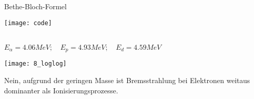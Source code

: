 \documentclass{alex_hü}
\begin{document}
\begin{mybox}{Bethe-Bloch-Formel}
	\centering \(  \)
	\tcblower
		\begin{minipage}{\textwidth}
			\texttt{[image: code]}
		\end{minipage}
		\vspace{0.5cm} \\
		\( E_{\alpha} = 4.06 \unit{MeV};\quad E_p = 4.93 \unit{MeV};\quad E_d = 4.59 \unit{MeV} \)
	\tcbline
		\begin{minipage}{\textwidth}
			\texttt{[image: 8\_loglog]}
		\end{minipage}
	\tcbline
		Nein, aufgrund der geringen Masse ist Bremsstrahlung bei Elektronen weitaus dominanter als Ionisierungsprozesse.
\end{mybox}
\end{document}
